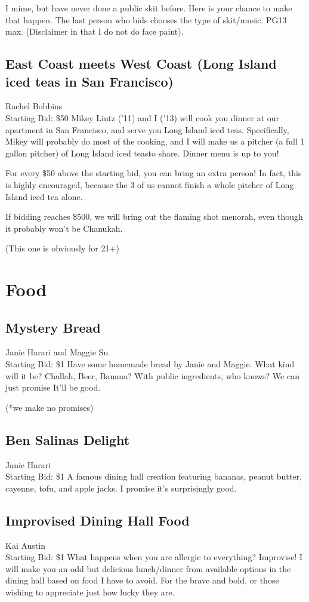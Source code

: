 \documentclass[11pt]{article}
\begin{document}
I mime, but have never done a public skit before. Here is your chance to make that happen. The last person who bids chooses the type of skit/music. PG13 max. (Disclaimer in that I do not do face paint).
\subsection{East Coast meets West Coast (Long Island iced teas in San Francisco)}
Rachel Bobbins
\\
Starting Bid: \$50
\newline
Mikey Lintz ('11) and I ('13) will cook you dinner at our apartment in San Francisco, and serve you Long Island iced teas. Specifically, Mikey will probably do most of the cooking, and I will make us a pitcher  (a full 1 gallon pitcher) of Long Island iced teasto share. Dinner menu is up to you!

For every \$50 above the starting bid, you can bring an extra person! In fact, this is highly encouraged, because the 3 of us cannot finish a whole pitcher of Long Island iced tea alone.

If bidding reaches \$500, we will bring out the flaming shot menorah, even though it probably won't be Chanukah.

(This one is obviously for 21+)
\section{Food}
\subsection{Mystery Bread}
Janie Harari and Maggie Su
\\
Starting Bid: \$1
\newline
Have some homemade bread by Janie and Maggie.  What kind will it be? Challah, Beer, Banana? With public ingredients, who knows?  We can just promise It'll be good.

(*we make no promises)
\subsection{Ben Salinas Delight}
Janie Harari
\\
Starting Bid: \$1
\newline
A famous dining hall creation featuring bananas, peanut butter, cayenne, tofu, and apple jacks.  I promise it's surprisingly good.
\subsection{Improvised Dining Hall Food}
Kai Austin
\\
Starting Bid: \$1
\newline
What happens when you are allergic to everything?
Improvise!
I will make you an odd but delicious lunch/dinner from available options in the dining hall based on food I have to avoid. For the brave and bold, or those wishing to appreciate just how lucky they are.
\end{document}
